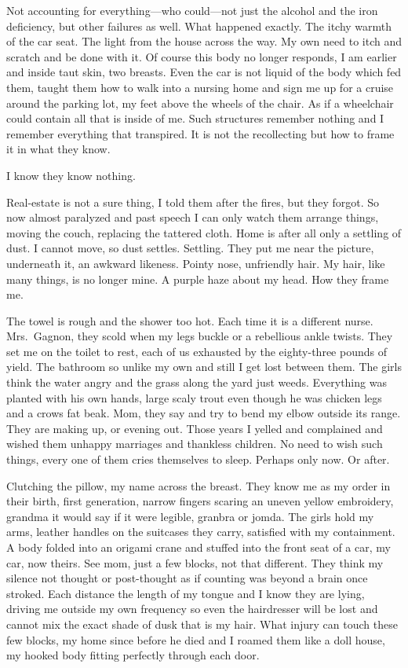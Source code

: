 \documentclass[
]{memoir}
\begin{document}
Not accounting for everything---who could---not just the alcohol and the
iron deficiency, but other failures as well. What happened exactly. The
itchy warmth of the car seat. The light from the house across the way.
My own need to itch and scratch and be done with it. Of course this body
no longer responds, I am earlier and inside taut skin, two breasts. Even
the car is not liquid of the body which fed them, taught them how to
walk into a nursing home and sign me up for a cruise around the parking
lot, my feet above the wheels of the chair. As if a wheelchair could
contain all that is inside of me. Such structures remember nothing and I
remember everything that transpired. It is not the recollecting but how
to frame it in what they know.

I know they know nothing.

Real-estate is not a sure thing, I told them after the fires, but they
forgot. So now almost paralyzed and past speech I can only watch them
arrange things, moving the couch, replacing the tattered cloth. Home is
after all only a settling of dust. I cannot move, so dust settles.
Settling. They put me near the picture, underneath it, an awkward
likeness. Pointy nose, unfriendly hair. My hair, like many things, is no
longer mine. A purple haze about my head. How they frame me.

The towel is rough and the shower too hot. Each time it is a different
nurse. Mrs.~Gagnon, they scold when my legs buckle or a rebellious ankle
twists. They set me on the toilet to rest, each of us exhausted by the
eighty-three pounds of yield. The bathroom so unlike my own and still I
get lost between them. The girls think the water angry and the grass
along the yard just weeds. Everything was planted with his own hands,
large scaly trout even though he was chicken legs and a crows fat beak.
Mom, they say and try to bend my elbow outside its range. They are
making up, or evening out. Those years I yelled and complained and
wished them unhappy marriages and thankless children. No need to wish
such things, every one of them cries themselves to sleep. Perhaps only
now. Or after.

Clutching the pillow, my name across the breast. They know me as my
order in their birth, first generation, narrow fingers scaring an uneven
yellow embroidery, grandma it would say if it were legible, granbra or
jomda. The girls hold my arms, leather handles on the suitcases they
carry, satisfied with my containment. A body folded into an origami
crane and stuffed into the front seat of a car, my car, now theirs. See
mom, just a few blocks, not that different. They think my silence not
thought or post-thought as if counting was beyond a brain once stroked.
Each distance the length of my tongue and I know they are lying, driving
me outside my own frequency so even the hairdresser will be lost and
cannot mix the exact shade of dusk that is my hair. What injury can
touch these few blocks, my home since before he died and I roamed them
like a doll house, my hooked body fitting perfectly through each door.
\end{document}
